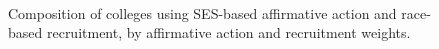 \begin{figure}
  \centering
   \\
  \caption{Composition of colleges using SES-based affirmative action
and race-based recruitment, by affirmative action and recruitment weights.}
  \label{fig:A23}
\end{figure}

